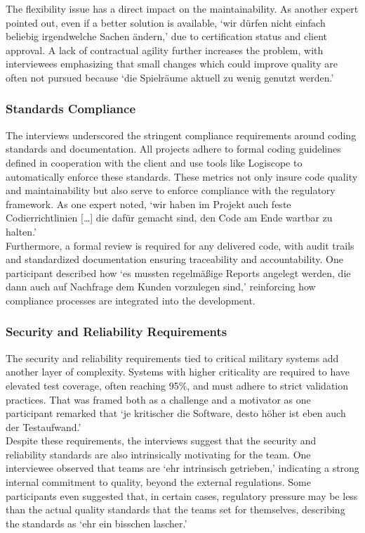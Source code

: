 The flexibility issue has a direct impact on the maintainability. As another expert pointed out, even if a better solution is available, `wir dürfen nicht einfach beliebig irgendwelche Sachen ändern,' due to certification status and client approval. A lack of contractual agility further increases the problem,
with interviewees emphasizing that small changes which could improve quality are often not pursued because `die Spielräume aktuell zu wenig genutzt werden.'

\subsubsection{Standards Compliance}
The interviews underscored the stringent compliance requirements around coding standards and documentation. All projects adhere to formal coding guidelines defined in cooperation with the client and use tools like Logiscope to automatically enforce these standards.
These metrics not only insure code quality and maintainability but also serve to enforce compliance with the regulatory framework. As one expert noted, `wir haben im Projekt auch feste Codierrichtlinien [\ldots] die dafür gemacht sind, den Code am Ende wartbar zu halten.'\\
Furthermore, a formal review is required for any delivered code, with audit trails and standardized documentation ensuring traceability and accountability. One participant described how `es mussten regelmäßige Reports angelegt werden, die dann auch auf Nachfrage dem Kunden vorzulegen sind,' reinforcing how compliance processes are integrated into the development.

\subsubsection{Security and Reliability Requirements}
The security and reliability requirements tied to critical military systems add another layer of complexity. Systems with higher criticality are required to have elevated test coverage, often reaching 95\%, and must adhere to strict validation practices. That was framed both as a challenge and a motivator
as one participant remarked that `je kritischer die Software, desto höher ist eben auch der Testaufwand.'\\
Despite these requirements, the interviews suggest that the security and reliability standards are also intrinsically motivating for the team. One interviewee observed that teams are `ehr intrinsisch getrieben,' indicating a strong internal commitment to quality, beyond the external regulations. 
Some participants even suggested that, in certain cases, regulatory pressure may be less than the actual quality standards that the teams set for themselves, describing the standards as `ehr ein bisschen lascher.'

